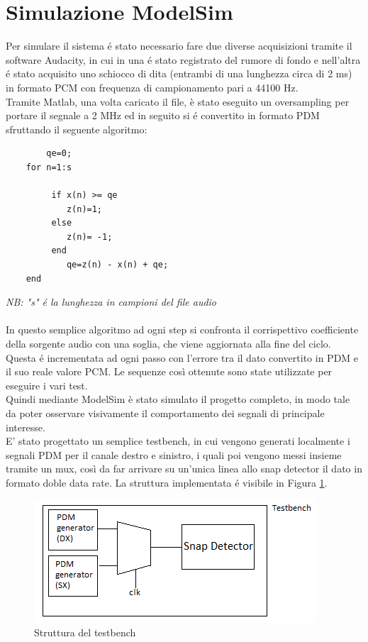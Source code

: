 \documentclass[a4paper, titlepage]{article}
\begin{document}
\section{Simulazione ModelSim}
Per simulare il sistema é stato necessario fare due diverse acquisizioni tramite il software Audacity, in cui in una é stato registrato del rumore di fondo e nell'altra é stato acquisito uno schiocco di dita (entrambi di una lunghezza circa di 2 ms) in formato PCM con frequenza di campionamento pari a 44100 Hz.\\Tramite Matlab, una volta caricato il file, è stato eseguito un oversampling per portare il segnale a 2 MHz ed in seguito si é convertito in formato PDM sfruttando il seguente algoritmo:
\begin{verbatim}
        qe=0;
    for n=1:s
        
         if x(n) >= qe
            z(n)=1;
         else
            z(n)= -1;
         end
            qe=z(n) - x(n) + qe;
    end
\end{verbatim}
\textit{NB: "s" é la lunghezza in campioni del file audio}\\\\
In questo semplice algoritmo ad ogni step si confronta il corrispettivo coefficiente della sorgente audio con una soglia, che viene aggiornata alla fine del ciclo. Questa é incrementata ad ogni passo  con l'errore tra il dato convertito in PDM e il suo reale valore PCM. Le sequenze così ottenute sono state utilizzate per eseguire i vari test.\\
Quindi mediante ModelSim è stato simulato il progetto completo, in modo tale da poter osservare visivamente il comportamento dei segnali di principale interesse.\\
E' stato progettato un semplice testbench, in cui vengono generati localmente i segnali PDM per il canale destro e sinistro, i quali poi vengono messi insieme tramite un mux, così da far arrivare su un'unica linea allo snap detector il dato in formato doble data rate. La struttura implementata é visibile in Figura \ref{fig:testbench}.
\begin{figure}[H]
    \centering
    \includegraphics[scale=0.8]{testbench.png}
    \caption{Struttura del testbench}
    \label{fig:testbench}
\end{figure}
\end{document}
